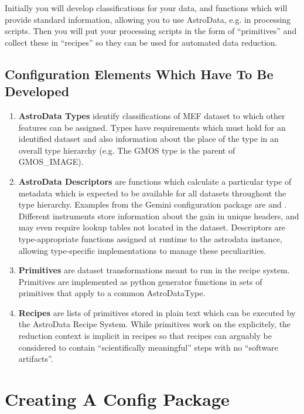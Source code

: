 \documentclass[letterpaper,10pt,english]{sphinxmanual}
\begin{document}
Initially you will develop classifications
for your data, and functions which will provide standard information, allowing
you to use AstroData, e.g. in processing scripts.  Then you will put your
processing scripts in the form of ``primitives'' and collect these in ``recipes''
so they can be used for automated data reduction.


\subsection{Configuration Elements Which Have To Be  Developed}
\label{configElements:configuration-elements-which-have-to-be-developed}\begin{enumerate}
\item {} 
\textbf{AstroData Types} identify classifications of MEF dataset to which other
features can be assigned. Types have requirements which must hold for
an identified dataset and also information about the place of the type in
an overall type hierarchy (e.g. The GMOS type is the parent of GMOS\_IMAGE).

\item {} 
\textbf{AstroData Descriptors} are functions which calculate a particular type
of metadata which is expected to be available for all datasets throughout
the type hierarchy. Examples from the Gemini configuration package are 
and .  Different instruments
store information about the gain in unique headers, and may even require
lookup tables not located in the dataset.  Descriptors are type-appropriate
functions assigned at runtime to the astrodata instance, allowing
type-specific implementations to manage these peculiarities.

\item {} 
\textbf{Primitives} are dataset transformations meant to run in the recipe system.
Primitives are implemented as python generator functions in sets of primitives
that apply to a common AstroDataType.

\item {} 
\textbf{Recipes} are lists of primitives stored in plain text which can be executed
by the AstroData Recipe System. While primitives work on the  explicitely, the reduction context is implicit in recipes
so that recipes can arguably be considered to contain
``scientifically meaningful'' steps with no ``software artifacts''.

\end{enumerate}


\section{Creating A Config Package}
\label{startingTheConfig:creating-a-config-package}\label{startingTheConfig::doc}
\end{document}
